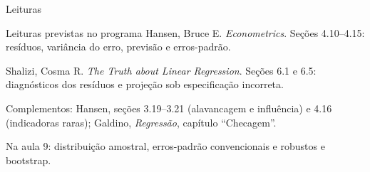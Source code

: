 \documentclass[
  ignorenonframetext,
  brazilian,
  aspectratio=169,
  10pt]{beamer}
\begin{document}
\begin{frame}{Leituras}
\protect{}\label{leituras}
\begin{block}{Leituras previstas no programa}
Hansen, Bruce E. \textit{Econometrics}. Seções 4.10--4.15:
resíduos, variância do erro, previsão e erros-padrão.

Shalizi, Cosma R. \textit{The Truth about Linear Regression}.
Seções 6.1 e 6.5: diagnósticos dos resíduos e projeção sob especificação incorreta.
\end{block}

\small

Complementos: Hansen, seções 3.19--3.21 (alavancagem e influência) e
4.16 (indicadoras raras); Galdino, \textit{Regressão}, capítulo
``Checagem''.

Na aula 9: distribuição amostral, erros-padrão convencionais e robustos
e bootstrap.
\end{frame}
\end{document}
